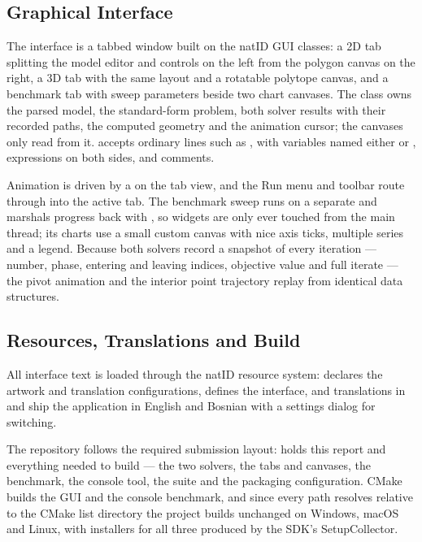 \documentclass[12pt, a4paper]{article}
\begin{document}
\subsection{Graphical Interface}
The interface is a tabbed window built on the natID GUI classes: a 2D tab splitting the model editor and controls on the left from the polygon canvas on the right, a 3D tab with the same layout and a rotatable polytope canvas, and a benchmark tab with sweep parameters beside two chart canvases. The class  owns the parsed model, the standard-form problem, both solver results with their recorded paths, the computed geometry and the animation cursor; the canvases only read from it.  accepts ordinary lines such as , with variables named either  or , expressions on both sides, and comments.

Animation is driven by a  on the tab view, and the Run menu and toolbar route through  into the active tab. The benchmark sweep runs on a separate  and marshals progress back with , so widgets are only ever touched from the main thread; its charts use a small custom canvas with nice axis ticks, multiple series and a legend. Because both solvers record a snapshot of every iteration --- number, phase, entering and leaving indices, objective value and full iterate --- the pivot animation and the interior point trajectory replay from identical data structures.

\subsection{Resources, Translations and Build}
All interface text is loaded through the natID resource system:  declares the artwork and translation configurations,  defines the interface, and translations in  and  ship the application in English and Bosnian with a settings dialog for switching.

The repository follows the required submission layout:  holds this report and  everything needed to build ---  the two solvers,  the tabs and canvases,  the benchmark,  the console tool,  the suite and  the packaging configuration. CMake builds the  GUI and the  console benchmark, and since every path resolves relative to the CMake list directory the project builds unchanged on Windows, macOS and Linux, with installers for all three produced by the SDK's SetupCollector.
\end{document}
